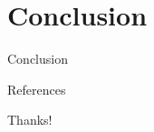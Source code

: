 \documentclass{beamer}
\begin{document}
    \section{Conclusion}

    \begin{frame}{Conclusion}

    \end{frame}

    \begin{frame}[allowframebreaks]{References}
        \vspace{-0.5cm}
        
        {\small
        
        }
    \end{frame}

    \begin{frame}
        \centering
        \Huge\calligra Thanks!
    \end{frame}
\end{document}

